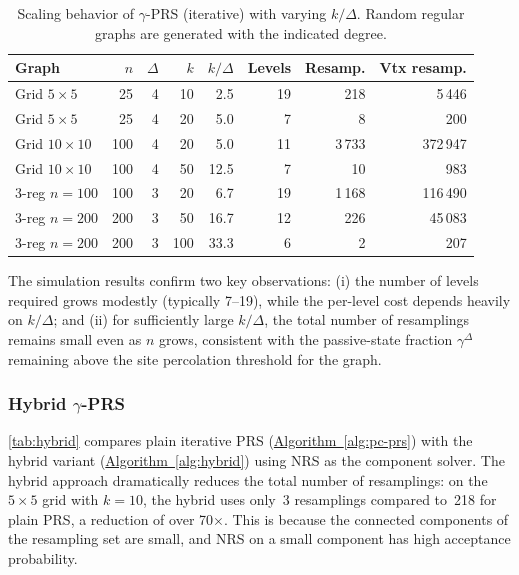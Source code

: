 \documentclass[12pt, a4paper]{article}
\theoremstyle{plain}
\theoremstyle{definition}
\theoremstyle{remark}
\newcommand{\sref}[2]{\hyperref[#2]{#1~\ref*{#2}}}
\begin{document}
\begin{table}[ht]
\centering
\begin{tabular}{l r r r r | r r r}
\hline
Graph & \(n\) & \(\Delta\) & \(k\) & \(k/\Delta\) & Levels & Resamp. & Vtx resamp. \\
\hline
Grid \(5\times5\) & 25 & 4 & 10 & 2.5 & 19 & 218 & 5\,446 \\
Grid \(5\times5\) & 25 & 4 & 20 & 5.0 & 7 & 8 & 200 \\
Grid \(10\times10\) & 100 & 4 & 20 & 5.0 & 11 & 3\,733 & 372\,947 \\
Grid \(10\times10\) & 100 & 4 & 50 & 12.5 & 7 & 10 & 983 \\
3-reg \(n=100\) & 100 & 3 & 20 & 6.7 & 19 & 1\,168 & 116\,490 \\
3-reg \(n=200\) & 200 & 3 & 50 & 16.7 & 12 & 226 & 45\,083 \\
3-reg \(n=200\) & 200 & 3 & 100 & 33.3 & 6 & 2 & 207 \\
\hline
\end{tabular}
\caption{Scaling behavior of \(\gamma\)-PRS (iterative) with varying \(k/\Delta\). Random regular graphs are generated with the indicated degree.}
\label{tab:scaling}
\end{table}

The simulation results confirm two key observations: (i) the number of levels required grows modestly (typically 7--19), while the per-level cost depends heavily on \(k/\Delta\); and (ii) for sufficiently large \(k/\Delta\), the total number of resamplings remains small even as \(n\) grows, consistent with the passive-state fraction \(\gamma^{\Delta}\) remaining above the site percolation threshold for the graph.

\subsubsection*{Hybrid \(\gamma\)-PRS}

\autoref{tab:hybrid} compares plain iterative PRS (\sref{Algorithm}{alg:pc-prs}) with the hybrid variant (\sref{Algorithm}{alg:hybrid}) using NRS as the component solver. The hybrid approach dramatically reduces the total number of resamplings: on the \(5\times5\) grid with \(k=10\), the hybrid uses only~3 resamplings compared to~218 for plain PRS, a reduction of over 70\(\times\). This is because the connected components of the resampling set are small, and NRS on a small component has high acceptance probability.
\end{document}
